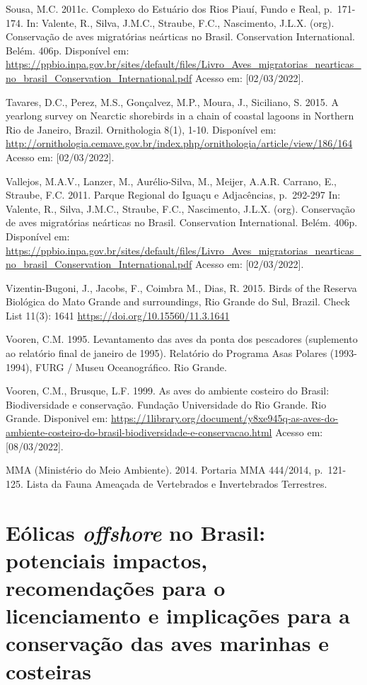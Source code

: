 \documentclass[
  oneside]{scrbook}
\begin{document}
Sousa, M.C. 2011c. Complexo do Estuário dos Rios Piauí, Fundo e Real, p.~171-174. In: Valente, R., Silva, J.M.C., Straube, F.C., Nascimento, J.L.X. (org). Conservação de aves migratórias neárticas no Brasil. Conservation International. Belém. 406p. Disponível em: \url{https://ppbio.inpa.gov.br/sites/default/files/Livro_Aves_migratorias_nearticas_no_brasil_Conservation_International.pdf} Acesso em: {[}02/03/2022{]}.

Tavares, D.C., Perez, M.S., Gonçalvez, M.P., Moura, J., Siciliano, S. 2015. A yearlong survey on Nearctic shorebirds in a chain of coastal lagoons in Northern Rio de Janeiro, Brazil. Ornithologia 8(1), 1-10. Disponível em: \url{http://ornithologia.cemave.gov.br/index.php/ornithologia/article/view/186/164} Acesso em: {[}02/03/2022{]}.

Vallejos, M.A.V., Lanzer, M., Aurélio-Silva, M., Meijer, A.A.R. Carrano, E., Straube, F.C. 2011. Parque Regional do Iguaçu e Adjacências, p.~292-297 In: Valente, R., Silva, J.M.C., Straube, F.C., Nascimento, J.L.X. (org). Conservação de aves migratórias neárticas no Brasil. Conservation International. Belém. 406p. Disponível em: \url{https://ppbio.inpa.gov.br/sites/default/files/Livro_Aves_migratorias_nearticas_no_brasil_Conservation_International.pdf} Acesso em: {[}02/03/2022{]}.

Vizentin-Bugoni, J., Jacobs, F., Coimbra M., Dias, R. 2015. Birds of the Reserva Biológica do Mato Grande and surroundings, Rio Grande do Sul, Brazil. Check List 11(3): 1641 \url{https://doi.org/10.15560/11.3.1641}

Vooren, C.M. 1995. Levantamento das aves da ponta dos pescadores (suplemento ao relatório final de janeiro de 1995). Relatório do Programa Asas Polares (1993-1994), FURG / Museu Oceanográfico. Rio Grande.

Vooren, C.M., Brusque, L.F. 1999. As aves do ambiente costeiro do Brasil: Biodiversidade e conservação. Fundação Universidade do Rio Grande. Rio Grande. Disponivel em: \url{https://1library.org/document/y8xe945q-as-aves-do-ambiente-costeiro-do-brasil-biodiversidade-e-conservacao.html} Acesso em: {[}08/03/2022{]}.

MMA (Ministério do Meio Ambiente). 2014. Portaria MMA 444/2014, p.~121-125. Lista da Fauna Ameaçada de Vertebrados e Invertebrados Terrestres.

\hypertarget{cap8}{%
\chapter{\texorpdfstring{Eólicas \emph{offshore} no Brasil: potenciais impactos, recomendações para o licenciamento e implicações para a conservação das aves marinhas e costeiras}{Eólicas offshore no Brasil: potenciais impactos, recomendações para o licenciamento e implicações para a conservação das aves marinhas e costeiras}}\label{cap8}}
\end{document}
